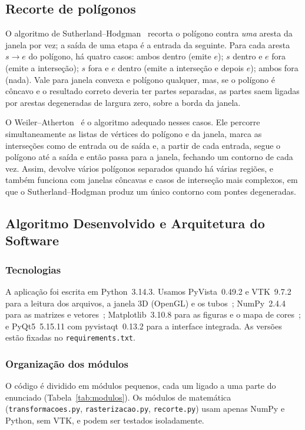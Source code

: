 \documentclass[11pt, a4paper]{article}
\newcommand{\arq}[1]{\texttt{#1}}
\begin{document}
\subsection{Recorte de polígonos}
O algoritmo de Sutherland--Hodgman~\cite{sutherland1974} recorta o polígono contra
\emph{uma} aresta da janela por vez; a saída de uma etapa é a entrada da seguinte.
Para cada aresta $s\to e$ do polígono, há quatro casos: ambos dentro (emite $e$);
$s$ dentro e $e$ fora (emite a interseção); $s$ fora e $e$ dentro (emite a interseção e
depois $e$); ambos fora (nada). Vale para janela convexa e polígono qualquer, mas,
se o polígono é côncavo e o resultado correto deveria ter partes separadas, as partes
saem ligadas por arestas degeneradas de largura zero, sobre a borda da janela.

O Weiler--Atherton~\cite{weiler1977} é o algoritmo adequado nesses casos. Ele
percorre simultaneamente as listas de vértices do polígono e da janela, marca as
interseções como de entrada ou de saída e, a partir de cada entrada, segue o
polígono até a saída e então passa para a janela, fechando um contorno de cada vez.
Assim, devolve vários polígonos separados quando há várias regiões, e também
funciona com janelas côncavas e casos de interseção mais complexos, em que o
Sutherland--Hodgman produz um único contorno com pontes degeneradas.

\subsection{Algoritmo Desenvolvido e Arquitetura do Software}
\label{sec:arquitetura}

\subsubsection{Tecnologias}
A aplicação foi escrita em Python~3.14.3. Usamos PyVista~0.49.2 e VTK~9.7.2
para a leitura dos arquivos, a janela 3D (OpenGL) e os tubos~\cite{pyvista,vtk};
NumPy~2.4.4 para as matrizes e vetores~\cite{numpy}; Matplotlib~3.10.8 para
as figuras e o mapa de cores~\cite{matplotlib}; e PyQt5~5.15.11 com pyvistaqt~0.13.2
para a interface integrada. As versões estão fixadas no \arq{requirements.txt}.

\subsubsection{Organização dos módulos}
O código é dividido em módulos pequenos, cada um ligado a uma parte do enunciado
(Tabela~\ref{tab:modulos}). Os módulos de matemática (\arq{transformacoes.py},
\arq{rasterizacao.py}, \arq{recorte.py}) usam apenas NumPy e Python, sem VTK, e podem
ser testados isoladamente.
\end{document}
